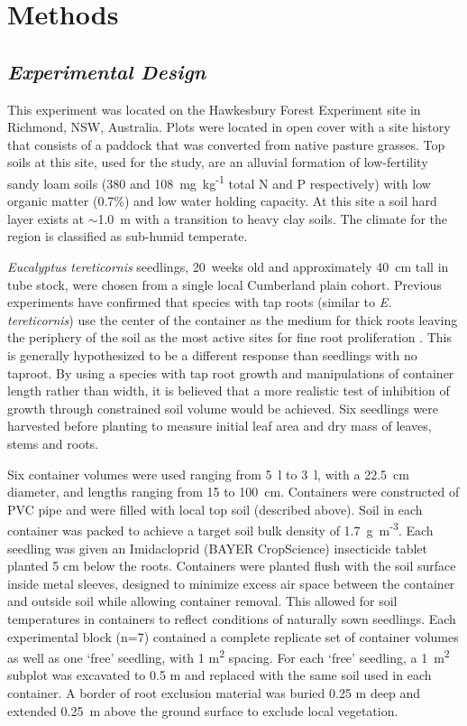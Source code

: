 \documentclass[a4paper]{article}\usepackage[]{graphicx}\usepackage[]{color}
\begin{document}
\section*{Methods}

\subsection*{\textit{Experimental Design}}

This experiment was located on the Hawkesbury Forest Experiment site in Richmond, NSW, Australia. Plots were located in open cover with a site history that consists of a paddock that was converted from native pasture grasses. Top soils at this site, used for the study, are an alluvial formation of low-fertility sandy loam soils (380 and 108~mg~kg\textsuperscript{-1} total N and P respectively) with low organic matter (0.7\%) and low water holding capacity. At this site a soil hard layer exists at $\sim$1.0~m with a transition to heavy clay soils. The climate for the region is classified as sub-humid temperate. 

\textit{Eucalyptus tereticornis} seedlings, 20~weeks old and approximately 40~cm tall in tube stock, were chosen from a single local Cumberland plain cohort. Previous experiments have confirmed that species with tap roots (similar to \textit{E. tereticornis}) use the center of the container as the medium for thick roots leaving the periphery of the soil as the most active sites for fine root proliferation \cite{biran1980a,biran1980b}. This is generally hypothesized to be a different response than seedlings with no taproot. By using a species with tap root growth and manipulations of container length rather than width, it is believed that a more realistic test of inhibition of growth through constrained soil volume would be achieved. Six seedlings were harvested before planting to measure initial leaf area and dry mass of leaves, stems and roots.

Six container volumes were used ranging from 5~l to 3~l, with a 22.5~cm diameter, and lengths ranging from 15 to 100~cm. Containers were constructed of PVC pipe and were filled with local top soil (described above). Soil in each container was packed to achieve a target soil bulk density of 1.7~g~m\textsuperscript{-3}. Each seedling was given an Imidacloprid (BAYER CropScience) insecticide tablet planted 5 cm below the roots. Containers were planted flush with the soil surface inside metal sleeves, designed to minimize excess air space between the container and outside soil while allowing container removal. This allowed for soil temperatures in containers to reflect conditions of naturally sown seedlings. Each experimental block (n=7) contained a complete replicate set of container volumes as well as one ‘free’ seedling, with 1 m\textsuperscript{2} spacing. For each ‘free’ seedling, a 1~m\textsuperscript{2} subplot was excavated to 0.5 m and replaced with the same soil used in each container. A border of root exclusion material was buried 0.25 m deep and extended 0.25~m above the ground surface to exclude local vegetation.
\end{document}
